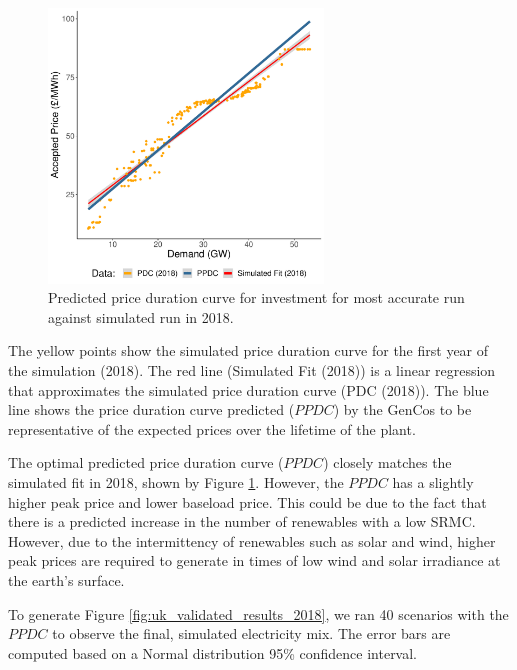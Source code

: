 \begin{figure}
	\centering
	\includegraphics[width=0.65\textwidth]{Chapter4/figures/e-Energy-2020/results/best_run_price_dur_curve.pdf}
	\caption{Predicted price duration curve for investment for most accurate run against simulated run in 2018.}
	\label{fig:best_price_curve}
\end{figure}

The yellow points show the simulated price duration curve for the first year of the simulation (2018). The red line (Simulated Fit (2018)) is a linear regression that approximates the simulated price duration curve (PDC (2018)). The blue line shows the price duration curve predicted ($PPDC$) by the GenCos to be representative of the expected prices over the lifetime of the plant.


The optimal predicted price duration curve ($PPDC$) closely matches the simulated fit in 2018, shown by Figure \ref{fig:best_price_curve}. However, the $PPDC$ has a slightly higher peak price and lower baseload price. This could be due to the fact that there is a predicted increase in the number of renewables with a low SRMC. However, due to the intermittency of renewables such as solar and wind, higher peak prices are required to generate in times of low wind and solar irradiance at the earth's surface.






To generate Figure \ref{fig:uk_validated_results_2018}, we ran 40 scenarios with the $PPDC$ to observe the final, simulated electricity mix. The error bars are computed based on a Normal distribution 95\% confidence interval.

